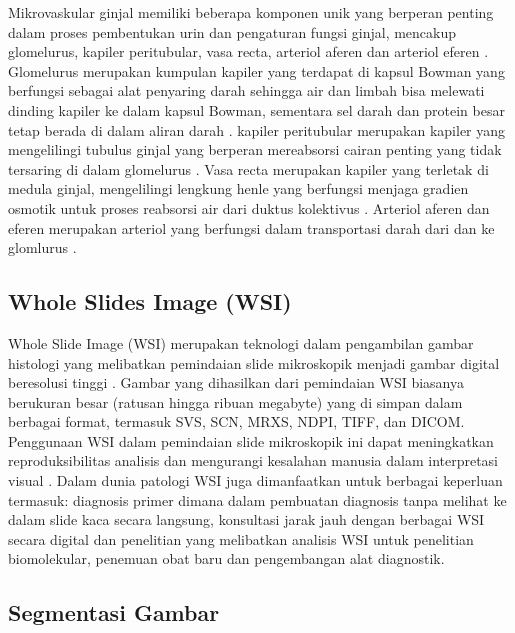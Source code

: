 \noindent Mikrovaskular ginjal memiliki beberapa komponen unik yang berperan penting dalam proses pembentukan urin dan pengaturan fungsi ginjal, mencakup glomelurus, kapiler peritubular, vasa recta, arteriol aferen dan arteriol eferen \cite{mescher_junqueiras_2021}. Glomelurus merupakan kumpulan kapiler yang terdapat di kapsul Bowman yang berfungsi sebagai alat penyaring darah sehingga air dan limbah bisa melewati dinding kapiler ke dalam kapsul Bowman, sementara sel darah dan protein besar tetap berada di dalam aliran darah \cite{luxen_unique_2023}. kapiler peritubular merupakan kapiler yang mengelilingi tubulus ginjal yang berperan mereabsorsi cairan penting yang tidak tersaring di dalam glomelurus \cite{savedchuk_targeting_2023}. Vasa recta merupakan kapiler yang terletak di medula ginjal, mengelilingi  lengkung henle yang berfungsi menjaga gradien osmotik untuk proses reabsorsi air dari duktus kolektivus \cite{goligorsky_emerging_2022}. Arteriol aferen dan eferen merupakan arteriol  yang berfungsi dalam transportasi darah dari dan ke glomlurus \cite{ergin_kidney_2021}.


\subsection{Whole Slides Image (WSI)}

\noindent Whole Slide Image (WSI) merupakan teknologi dalam pengambilan gambar histologi yang melibatkan pemindaian slide mikroskopik menjadi gambar digital beresolusi tinggi \cite{hanna_whole_2020}. Gambar yang dihasilkan dari pemindaian WSI biasanya berukuran besar (ratusan hingga ribuan megabyte) yang di simpan dalam berbagai format, termasuk SVS, SCN, MRXS, NDPI, TIFF, dan DICOM. Penggunaan WSI dalam pemindaian slide mikroskopik ini dapat meningkatkan reproduksibilitas analisis dan mengurangi kesalahan manusia dalam interpretasi visual \cite{li_hardware-software_2023}. Dalam dunia patologi WSI juga dimanfaatkan untuk berbagai keperluan termasuk: diagnosis primer dimana dalam pembuatan diagnosis tanpa melihat ke dalam slide kaca secara langsung, konsultasi jarak jauh dengan berbagai WSI secara digital dan penelitian yang melibatkan analisis WSI untuk penelitian biomolekular, penemuan obat baru dan pengembangan alat diagnostik.


 
\subsection{Segmentasi Gambar}

